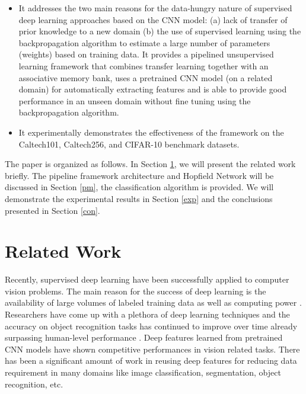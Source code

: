 \documentclass[conference]{IEEEtran}
\begin{document}
\begin{itemize}
\item It addresses the two main reasons for the data-hungry nature of supervised deep learning approaches based on the CNN model:  (a) lack of transfer of prior knowledge to a new domain (b) the use of supervised learning using the backpropagation algorithm to estimate a large number of parameters (weights) based on training data.  It provides a  pipelined  unsupervised learning framework  that combines transfer learning  together with an associative memory bank,  uses a pretrained CNN model (on a related domain) for automatically extracting features and is able to provide good performance in an unseen domain without fine tuning using the backpropagation algorithm.
\item It experimentally demonstrates the effectiveness of the framework on the Caltech101, Caltech256, and CIFAR-10 benchmark datasets.
\end{itemize}\par

The paper is organized as follows. In Section \ref{rw}, we will present the related work briefly. The pipeline framework architecture and Hopfield Network will be discussed in Section \ref{pm}, the classification algorithm is provided. We will demonstrate the experimental results in Section \ref{exp} and the conclusions presented in Section \ref{con}.  

\section{Related Work}\label{rw}

Recently, supervised deep learning have been successfully applied to computer vision problems. The main reason for the success of deep learning  is the availability of  large volumes of labeled training data as well as computing power \cite{krizhevsky2012imagenet}. Researchers have come up with a plethora of   deep learning techniques and the accuracy on object recognition tasks has continued to improve over time already surpassing human-level performance \cite{he2015delving,mnih2015human}. Deep features learned from  pretrained CNN models have shown competitive performances  in vision related tasks. There has been a significant amount of work in reusing  deep features for reducing data requirement  in many  domains \cite{girshick2015fast,girshick2014rich}  like image classification, segmentation, object recognition, etc.\par
\end{document}
